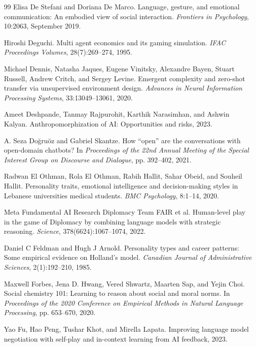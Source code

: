 \documentclass[11pt,a4paper]{article}
\begin{document}
\begin{thebibliography}{99}
Elisa De Stefani and Doriana De Marco. Language, gesture, and emotional communication: An embodied view of social interaction. \textit{Frontiers in Psychology}, 10:2063, September 2019.

Hiroshi Deguchi. Multi agent economics and its gaming simulation. \textit{IFAC Proceedings Volumes}, 28(7):269--274, 1995.

Michael Dennis, Natasha Jaques, Eugene Vinitsky, Alexandre Bayen, Stuart Russell, Andrew Critch, and Sergey Levine. Emergent complexity and zero-shot transfer via unsupervised environment design. \textit{Advances in Neural Information Processing Systems}, 33:13049--13061, 2020.

Ameet Deshpande, Tanmay Rajpurohit, Karthik Narasimhan, and Ashwin Kalyan. Anthropomorphization of AI: Opportunities and risks, 2023.

A. Seza Doğruöz and Gabriel Skantze. How ``open'' are the conversations with open-domain chatbots? In \textit{Proceedings of the 22nd Annual Meeting of the Special Interest Group on Discourse and Dialogue}, pp. 392--402, 2021.

Radwan El Othman, Rola El Othman, Rabih Hallit, Sahar Obeid, and Souheil Hallit. Personality traits, emotional intelligence and decision-making styles in Lebanese universities medical students. \textit{BMC Psychology}, 8:1--14, 2020.

Meta Fundamental AI Research Diplomacy Team FAIR et al. Human-level play in the game of Diplomacy by combining language models with strategic reasoning. \textit{Science}, 378(6624):1067--1074, 2022.

Daniel C Feldman and Hugh J Arnold. Personality types and career patterns: Some empirical evidence on Holland's model. \textit{Canadian Journal of Administrative Sciences}, 2(1):192--210, 1985.

Maxwell Forbes, Jena D. Hwang, Vered Shwartz, Maarten Sap, and Yejin Choi. Social chemistry 101: Learning to reason about social and moral norms. In \textit{Proceedings of the 2020 Conference on Empirical Methods in Natural Language Processing}, pp. 653--670, 2020.

Yao Fu, Hao Peng, Tushar Khot, and Mirella Lapata. Improving language model negotiation with self-play and in-context learning from AI feedback, 2023.


\end{thebibliography}
\end{document}
